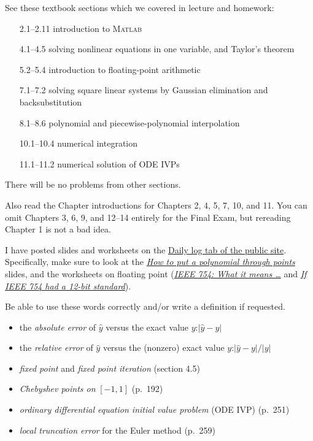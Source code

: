\documentclass[12pt]{amsart}
\newcommand{\Matlab}{\textsc{Matlab}\xspace}
\begin{document}
  See these textbook sections which we covered in lecture and homework:
\begin{itemize}[leftmargin=25mm,labelsep=5mm]
\item[2.1--2.11]     introduction to \Matlab
\item[4.1--4.5]      solving nonlinear equations in one variable, and Taylor's theorem
\item[5.2--5.4]      introduction to floating-point arithmetic
\item[7.1--7.2]      solving square linear systems by Gaussian elimination and backsubstitution
\item[8.1--8.6]      polynomial and piecewise-polynomial interpolation
\item[10.1--10.4]    numerical integration
\item[11.1--11.2]    numerical solution of ODE IVPs
\end{itemize}
There will be no problems from other sections.

\noindent Also read the Chapter introductions for Chapters 2, 4, 5, 7, 10, and 11.  You can omit Chapters 3, 6, 9, and 12--14 entirely for the Final Exam, but rereading Chapter 1 is not a bad idea.

  I have posted slides and worksheets on the \href{https://bueler.github.io/numerical/daily.html}{Daily log tab of the public site}.  Specifically, make sure to look at the \href{https://bueler.github.io/numerical/assets//slides/F24/polynonewt.pdf}{\emph{How to put a polynomial through points}} slides, and the worksheets on floating point (\href{https://bueler.github.io/numerical/assets//worksheets/F24/ieeefloat.pdf}{\emph{IEEE 754: What it means \dots}} and \href{https://bueler.github.io/numerical/assets//worksheets/F24/binary12.pdf}{\emph{If IEEE 754 had a 12-bit standard}}).

  Be able to use these words correctly and/or write a definition if requested.
  \begin{itemize}
  \item  the \emph{absolute error} of $\hat y$ versus the exact value $y$:\quad $|\hat y - y|$
  \item  the \emph{relative error} of $\hat y$ versus the (nonzero) exact value $y$:\quad $|\hat y - y|/|y|$  
  \item  \emph{fixed point} and \emph{fixed point iteration}  (section 4.5)
  \item \emph{Chebyshev points on} $[-1,1]$ (p.~192)
  \item \emph{ordinary differential equation initial value problem} (ODE IVP) (p.~251)
  \item \emph{local truncation error} for the Euler method (p.~259)
  \end{itemize}
\end{document}
